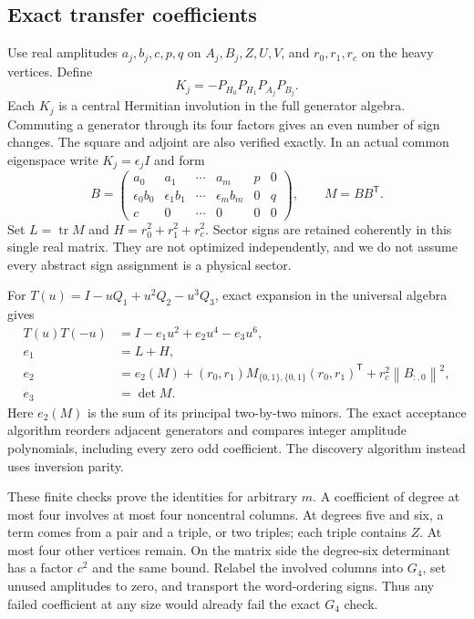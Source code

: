 \documentclass[11pt,a4paper]{article}
\theoremstyle{remark}\newtheorem{remark}[theorem]{Remark}
\newcommand{\tr}{\operatorname{tr}}
\newcommand{\norm}[1]{\left\lVert#1\right\rVert}
\begin{document}
\subsection{Exact transfer coefficients}
Use real amplitudes $a_j,b_j,c,p,q$ on $A_j,B_j,Z,U,V$, and
$r_0,r_1,r_c$ on the heavy vertices. Define
\[
 K_j=-P_{H_0}P_{H_1}P_{A_j}P_{B_j}.
\]
Each $K_j$ is a central Hermitian involution in the full generator
algebra. Commuting a generator through its four factors gives an even
number of sign changes. The square and adjoint are also verified exactly.
In an actual common eigenspace write $K_j=\epsilon_j I$ and form
\begin{equation}\label{eq:B}
 B=\begin{pmatrix}
 a_0&a_1&\cdots&a_m&p&0\\
 \epsilon_0b_0&\epsilon_1b_1&\cdots&\epsilon_mb_m&0&q\\
 c&0&\cdots&0&0&0
 \end{pmatrix},\qquad M=BB^{\mathsf T}.
\end{equation}
Set $L=\tr M$ and $H=r_0^2+r_1^2+r_c^2$. Sector signs are retained
coherently in this single real matrix. They are not optimized
independently, and we do not assume every abstract sign assignment is a
physical sector.

For $T(u)=I-uQ_1+u^2Q_2-u^3Q_3$, exact expansion in the universal
algebra gives
\begin{align}
 T(u)T(-u)&=I-e_1u^2+e_2u^4-e_3u^6,\label{eq:transfer}\\
 e_1&=L+H,\nonumber\\
 e_2&=e_2(M)+(r_0,r_1)M_{\{0,1\},\{0,1\}}(r_0,r_1)^{\mathsf T}
               +r_c^2\norm{B_{:,0}}^2,\label{eq:e2}\\
 e_3&=\det M.\nonumber
\end{align}
Here $e_2(M)$ is the sum of its principal two-by-two minors. The exact
acceptance algorithm reorders adjacent generators and compares integer
amplitude polynomials, including every zero odd coefficient. The
discovery algorithm instead uses inversion parity.

These finite checks prove the identities for arbitrary $m$. A coefficient
of degree at most four involves at most four noncentral columns. At
degrees five and six, a term comes from a pair and a triple, or two
triples; each triple contains $Z$. At most four other vertices remain.
On the matrix side the degree-six determinant has a factor $c^2$ and
the same bound. Relabel the involved columns into $G_4$, set unused
amplitudes to zero, and transport the word-ordering signs. Thus any
failed coefficient at any size would already fail the exact $G_4$ check.
\end{document}
